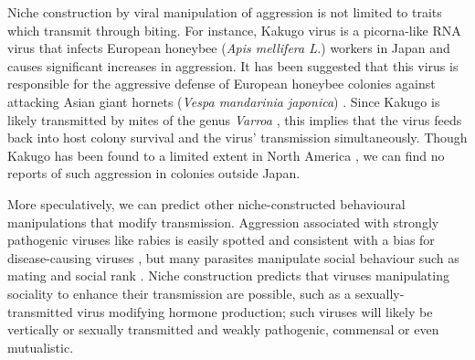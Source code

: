 \documentclass[review,draft,12pt]{elsarticle}
\begin{document}
Niche construction by viral manipulation of aggression is not limited to
traits which transmit through biting. For instance, Kakugo virus is a
picorna-like RNA virus that infects European honeybee (\emph{Apis
mellifera L.}) workers in Japan and causes significant increases in
aggression. It has been suggested that this virus is responsible for the
aggressive defense of European honeybee colonies against attacking Asian
giant hornets (\emph{Vespa mandarinia japonica})
\citep{Fujiyuki:2005nx}. Since Kakugo is likely transmitted by mites of
the genus \emph{Varroa} \citep{Fujiyuki:2006od}, this implies that the
virus feeds back into host colony survival and the virus' transmission
simultaneously. Though Kakugo has been found to a limited extent in
North America \citep{Bromenshenk:2010vn}, we can find no reports of such
aggression in colonies outside Japan.

More speculatively, we can predict other niche-constructed behavioural
manipulations that modify transmission. Aggression associated with
strongly pathogenic viruses like rabies is easily spotted and consistent
with a bias for disease-causing viruses \citep{Lecuit:2013jk}, but many
parasites manipulate social behaviour such as mating and social rank
\citep[e.g.][]{Klein:2003lr}. Niche construction predicts that viruses
manipulating sociality to enhance their transmission are possible, such
as a sexually-transmitted virus modifying hormone production; such
viruses will likely be vertically or sexually transmitted and weakly
pathogenic, commensal or even mutualistic.
\end{document}
